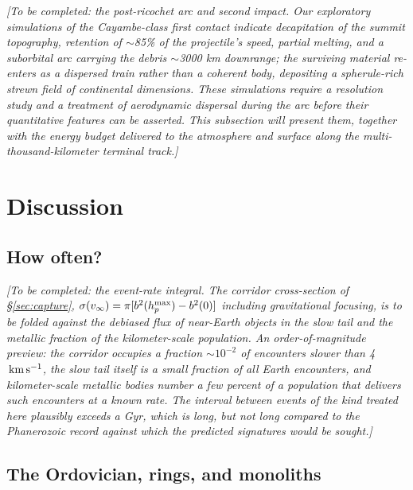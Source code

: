 \documentclass[twocolumn]{aastex701}
\newcommand{\vinf}{v_{\infty}}
\newcommand{\kms}{\ensuremath{{\rm \,km\,s^{-1}}}}
\begin{document}
\textit{[To be completed: the post-ricochet arc and second impact. Our
exploratory simulations of the Cayambe-class first contact indicate
decapitation of the summit topography, retention of $\sim$85\% of the
projectile's speed, partial melting, and a suborbital arc carrying the
debris $\sim$3000 km downrange; the surviving material re-enters as a
dispersed train rather than a coherent body, depositing a spherule-rich
strewn field of continental dimensions. These simulations require a
resolution study and a treatment of aerodynamic dispersal during the arc
before their quantitative features can be asserted. This subsection will
present them, together with the energy budget delivered to the atmosphere
and surface along the multi-thousand-kilometer terminal track.]}

\section{Discussion} \label{sec:discussion}

\subsection{How often?} \label{sec:rate}

\textit{[To be completed: the event-rate integral. The corridor
cross-section of \S\ref{sec:capture}, $\sigma(\vinf) = \pi
[b^{2}(h_{p}^{\rm max}) - b^{2}(0)]$ including gravitational focusing, is
to be folded against the debiased flux of near-Earth objects in the slow
tail \citep{granvik2018, nesvorny2023} and the metallic fraction of the
kilometer-scale population. An order-of-magnitude preview: the corridor
occupies a fraction $\sim10^{-2}$ of encounters slower than 4 \kms, the
slow tail itself is a small fraction of all Earth encounters, and
kilometer-scale metallic bodies number a few percent of a population that
delivers such encounters at a known rate. The interval between events of
the kind treated here plausibly exceeds a Gyr, which is long, but not long
compared to the Phanerozoic record against which the predicted signatures
would be sought.]}

\subsection{The Ordovician, rings, and monoliths} \label{sec:ordovician}
\end{document}
